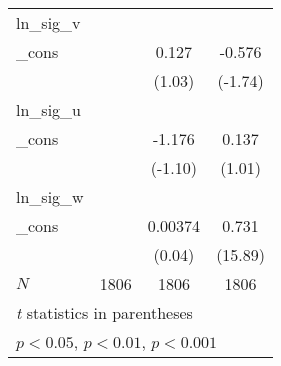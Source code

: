 \begin{table}[htbp]
\begin{tabular}{l*{3}{c}}
\hline
ln\_sig\_v    &                     &                     &                     \\
\_cons      &                     &       0.127         &      -0.576         \\
            &                     &      (1.03)         &     (-1.74)         \\
\hline
ln\_sig\_u    &                     &                     &                     \\
\_cons      &                     &      -1.176         &       0.137         \\
            &                     &     (-1.10)         &      (1.01)         \\
\hline
ln\_sig\_w    &                     &                     &                     \\
\_cons      &                     &     0.00374         &       0.731\sym{***}\\
            &                     &      (0.04)         &     (15.89)         \\
\hline
\(N\)       &        1806         &        1806         &        1806         \\
\hline\hline
\multicolumn{4}{l}{\footnotesize \textit{t} statistics in parentheses}\\
\multicolumn{4}{l}{\footnotesize \sym{*} \(p<0.05\), \sym{**} \(p<0.01\), \sym{***} \(p<0.001\)}\\
\end{tabular}
\end{table}
